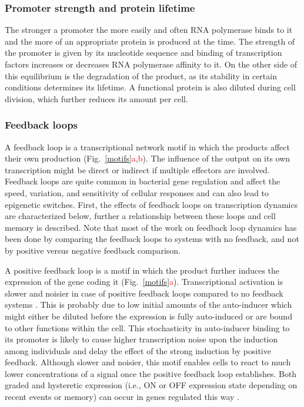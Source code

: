 \subsubsection{Promoter strength and protein lifetime}
The stronger a promoter the more easily and often RNA polymerase binds to it and the more of an appropriate protein is produced at the time.
The strength of the promoter is given by its nucleotide sequence and binding of transcription factors increases or decreases RNA polymerase affinity to it.
On the other side of this equilibrium is the degradation of the product, as its stability in certain conditions determines its lifetime.
A functional protein is also diluted during cell division, which further reduces its amount per cell.

\subsubsection{Feedback loops}
A feedback loop is a transcriptional network motif in which the products affect their own production (Fig.~\ref{motifs}\textcolor{red}{a},\textcolor{red}{b}).
The influence of the output on its own transcription might be direct or indirect if multiple effectors are involved.
Feedback loops are quite common in bacterial gene regulation and affect the speed, variation, and sensitivity of cellular responses and can also lead to epigenetic switches.
First, the effects of feedback loops on transcription dynamics are characterized below, further a relationship between these loops and cell memory is described.
Note that most of the work on feedback loop dynamics has been done by comparing the feedback loops to systems with no feedback, and not by positive versus negative feedback comparison.

A positive feedback loop is a motif in which the product further induces the expression of the gene coding it (Fig.~\ref{motifs}\textcolor{red}{a}).
Transcriptional activation is slower and noisier in case of positive feedback loops compared to no feedback systems \cite{maeda2006regulatory, sayut2007noise}.
This is probably due to low initial amounts of the auto-inducer which might either be diluted before the expression is fully auto-induced or are bound to other functions within the cell.
This stochasticity in auto-inducer binding to its promoter is likely to cause higher transcription noise upon the induction among individuals and delay the effect of the strong induction by positive feedback.
Although slower and noisier, this motif enables cells to react to much lower concentrations of a signal once the positive feedback loop establishes.
Both graded and hysteretic expression (i.e., ON or OFF expression state depending on recent events or memory) can occur in genes regulated this way \cite{maeda2006regulatory}.

